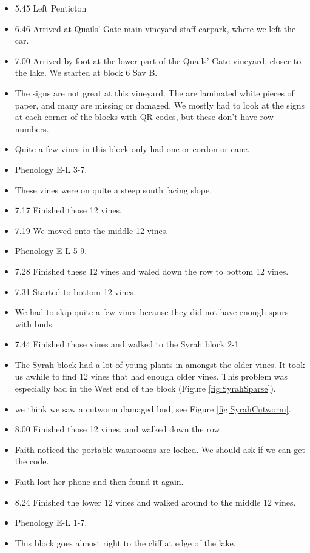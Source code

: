 \documentclass[11pt,letter]{article}
\newenvironment{smitemize}{
\begin{itemize}
  \setlength{\itemsep}{0pt}
  \setlength{\parskip}{0.8pt}
  \setlength{\parsep}{0pt}}
{\end{itemize}
}
\begin{document}
\begin{smitemize}
\item 5.45 Left Penticton 
\item 6.46 Arrived at Quails' Gate main vineyard staff carpark, where we left the car.
\item 7.00 Arrived by foot at the lower part of the Quails' Gate vineyard, closer to the lake. We started at block 6 Sav B.
\item The signs are not great at this vineyard. The are laminated white pieces of paper, and many are missing or damaged. We mostly had to look at the signs at each corner of the blocks with QR codes, but these don't have row numbers.
\item Quite a few vines in this block only had one or cordon or cane. 
\item Phenology E-L 3-7.{}
\item These vines were on quite a steep south facing slope.  
\item 7.17 Finished those 12 vines.
\item 7.19 We moved onto the middle 12 vines. 
\item Phenology E-L 5-9.
\item 7.28 Finished these 12 vines and waled down the row to bottom 12 vines. 
\item 7.31 Started to bottom 12 vines.
\item We had to skip quite a few vines because they did not have enough spurs with buds. 
\item 7.44 Finished those vines and walked to the Syrah block 2-1.
\item The Syrah block had a lot of young plants in amongst the older vines. It took us awhile to find 12 vines that had enough older vines. This problem was especially bad in the West end of the block (Figure \ref{fig:SyrahSparse}).
\item we think we saw a cutworm damaged bud, see Figure \ref{fig:SyrahCutworm}. 
\item 8.00 Finished those 12 vines, and walked down the row. 
\item Faith noticed the portable washrooms are locked. We should ask if we can get the code. 
\item Faith lost her phone and then found it again.
\item 8.24 Finished the lower 12 vines and walked around to the middle 12 vines. 
\item Phenology E-L 1-7.
\item This block goes almost right to the cliff at edge of the lake. 

\end{smitemize}
\end{document}
